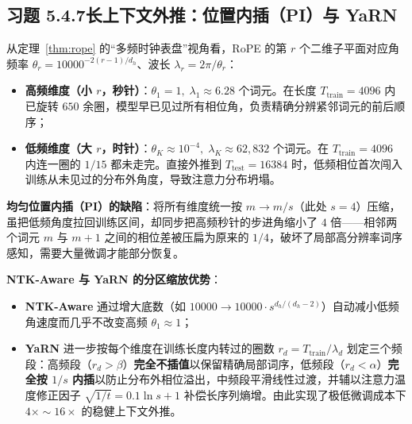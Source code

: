 \subsection*{习题 5.4.7\quad 长上下文外推：位置内插（PI）与 YaRN}
从定理~\ref{thm:rope} 的“多频时钟表盘”视角看，RoPE 的第 $r$ 个二维子平面对应角频率 $\theta_r = 10000^{-2(r-1)/d_h}$、波长 $\lambda_r = 2\pi / \theta_r$：
\begin{itemize}
  \item \textbf{高频维度（小 $r$，秒针）}：$\theta_1 = 1,\; \lambda_1 \approx 6.28$ 个词元。在长度 $T_{\text{train}} = 4096$ 内已旋转 $650$ 余圈，模型早已见过所有相位角，负责精确分辨紧邻词元的前后顺序；
  \item \textbf{低频维度（大 $r$，时针）}：$\theta_K \approx 10^{-4},\; \lambda_K \approx 62{,}832$ 个词元。在 $T_{\text{train}} = 4096$ 内连一圈的 $1/15$ 都未走完。直接外推到 $T_{\text{test}} = 16384$ 时，低频相位首次闯入训练从未见过的分布外角度，导致注意力分布坍塌。
\end{itemize}
\textbf{均匀位置内插（PI）的缺陷}：将所有维度统一按 $m \to m / s$（此处 $s = 4$）压缩，虽把低频角度拉回训练区间，却同步把高频秒针的步进角缩小了 $4$ 倍——相邻两个词元 $m$ 与 $m+1$ 之间的相位差被压扁为原来的 $1/4$，破坏了局部高分辨率词序感知，需要大量微调才能部分恢复。

\textbf{NTK-Aware 与 YaRN 的分区缩放优势}：
\begin{itemize}
  \item \textbf{NTK-Aware} 通过增大底数（如 $10000 \to 10000 \cdot s^{d_h/(d_h-2)}$）自动减小低频角速度而几乎不改变高频 $\theta_1 \approx 1$；
  \item \textbf{YaRN} 进一步按每个维度在训练长度内转过的圈数 $r_d = T_{\text{train}} / \lambda_d$ 划定三个频段：高频段（$r_d > \beta$）\textbf{完全不插值}以保留精确局部词序，低频段（$r_d < \alpha$）\textbf{完全按 $1/s$ 内插}以防止分布外相位溢出，中频段平滑线性过渡，并辅以注意力温度修正因子 $\sqrt{1/t} = 0.1\ln s + 1$ 补偿长序列熵增。由此实现了极低微调成本下 $4\times \sim 16\times$ 的稳健上下文外推。
\end{itemize}

